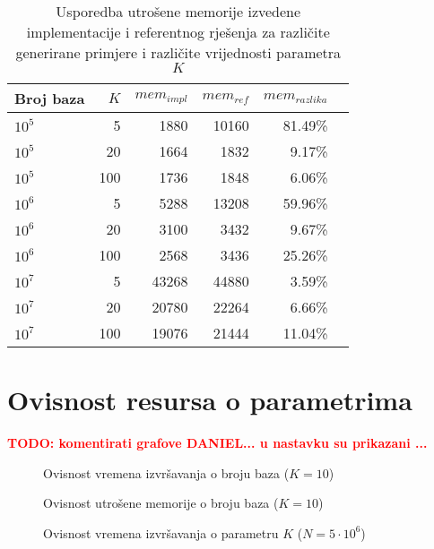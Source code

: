\documentclass[times, utf8, seminar, numeric]{fer}
\newcommand\todo[1]{\textbf{\textcolor{red}{TODO: #1}}}
\begin{document}
\begin{table}[h]
	\centering
	\caption{Usporedba utrošene memorije izvedene implementacije i referentnog rješenja za različite generirane primjere i različite vrijednosti parametra $K$}
	\label{tbl:memory-generated}
	
	\begin{tabular}{lrrrrr}
		\hline
        Broj baza & $K$ & $mem_{impl}$ & $mem_{ref}$ & $mem_{razlika}$ \\ \hline
        $10^5$ & 5 & 1880 & 10160 & 81.49\% \\
        $10^5$ & 20 & 1664 & 1832 & 9.17\% \\
        $10^5$ & 100 & 1736 & 1848 & 6.06\% \\ \hline
        $10^6$ & 5 & 5288 & 13208 & 59.96\% \\
        $10^6$ & 20 & 3100 & 3432 & 9.67\% \\
        $10^6$ & 100 & 2568 & 3436 & 25.26\% \\ \hline
        $10^7$ & 5 & 43268 & 44880 & 3.59\% \\
        $10^7$ & 20 & 20780 & 22264 & 6.66\% \\
        $10^7$ & 100 & 19076 & 21444 & 11.04\% \\
    \hline
	\end{tabular}
\end{table}

\section{Ovisnost resursa o parametrima}
\todo{komentirati grafove DANIEL... u nastavku su prikazani ...} \\

\begin{figure}[!h]
	\centering
	\def\svgwidth{.7\columnwidth}
	
  \caption{Ovisnost vremena izvršavanja o broju baza ($K = 10$)}
\end{figure}

\begin{figure}[!h]
	\centering
	\def\svgwidth{.7\columnwidth}
	
  \caption{Ovisnost utrošene memorije o broju baza ($K = 10$)}
\end{figure}

\begin{figure}[!h]
	\centering
	\def\svgwidth{.7\columnwidth}
	
  \caption{Ovisnost vremena izvršavanja o parametru $K$ ($N = 5 \cdot 10^6$)}
\end{figure}
\end{document}
